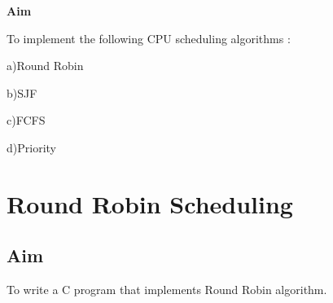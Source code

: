 \documentclass[a4paper]{article}
\begin{document}
\textbf{{\Large Aim
}}\\
\vspace{1.5pt}
\par To implement the following CPU scheduling algorithms :\par a)Round Robin\par b)SJF\par c)FCFS\par d)Priority
\vspace{1.5pt
}
\section{Round Robin Scheduling}

\subsection{Aim}
To write a C program that implements Round Robin algorithm.
\end{document}
